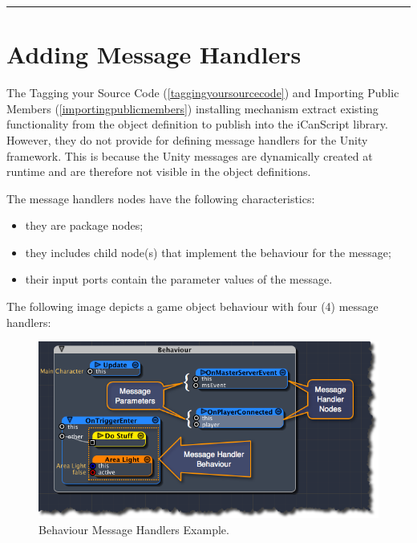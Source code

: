 \begin{center}\rule{\textwidth}{0.4pt}\end{center}

\chapter{Adding Message Handlers}
\label{addingmessagehandlers}

The Tagging your Source Code (\autoref{taggingyoursourcecode}) and Importing Public Members (\autoref{importingpublicmembers}) installing mechanism extract existing functionality from the object definition to publish into the iCanScript library. However, they do not provide for defining message handlers for the Unity framework. This is because the Unity messages are dynamically created at runtime and are therefore not visible in the object definitions.

The message handlers nodes have the following characteristics:

\begin{itemize}
\item they are package nodes;

\item they includes child node(s) that implement the behaviour for the message;

\item their input ports contain the parameter values of the message.

\end{itemize}

The following image depicts a game object behaviour with four (4) message handlers:

\begin{figure}[htbp]
\centering
\includegraphics[keepaspectratio,width=\textwidth,height=0.75\textheight]{behaviour-message-handlers2.png}
\caption{Behaviour Message Handlers Example.}
\label{behaviour-message-handlers2.png}
\end{figure}

